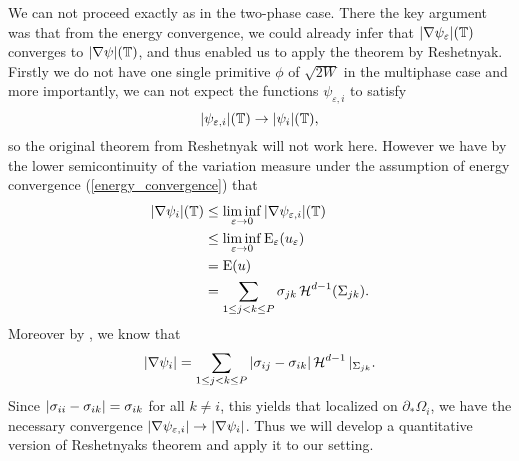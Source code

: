 \begin{remark}
	\label{difference_twophase_multiphase_curvature}
	We can not proceed exactly as in the two-phase case. There the key argument 
	was that from the energy convergence, we could already infer that 
	$ \abs{ \nabla \psi_{ \varepsilon } } ( \operatorname{\mathbb{T}} ) $ converges to $ \abs{ 
	\nabla \psi } ( \operatorname{\mathbb{T}} ) $, and thus enabled us to apply the theorem by 
	Reshetnyak. Firstly we do not have one single
	primitive $ \phi $ of $ \sqrt{ 2 W } $ in the multiphase case and more 
	importantly, we can 
	not expect the functions $ 
	\psi_{ \varepsilon ,  i } $ to satisfy 
	\begin{equation}
		\label{energy_convergence_of_psi_i}
		\abs{ \psi_{ \varepsilon ,i } } ( \operatorname{\mathbb{T}} ) \to \abs{ \psi_{ i } } ( 
		\operatorname{\mathbb{T}} ),
	\end{equation}
	so the original theorem from Reshetnyak will not work here. However we have 
	by the lower semicontinuity of the variation measure under the assumption 
	of energy convergence (\ref{energy_convergence}) that
	\begin{align*}
		\abs{ \nabla \psi_{ i } } ( \operatorname{\mathbb{T}} )
		&
		\leq
		\liminf_{ \varepsilon \to 0 }
		\abs{ \nabla \psi_{ \varepsilon , i } } ( \operatorname{\mathbb{T}} )
		\\
		& \leq
		\liminf_{ \varepsilon \to 0 }
		\operatorname{E}_{ \varepsilon } ( u_{ \varepsilon } )
		\\
		& =
		\operatorname{E} ( u )
		\\
		& =
		\sum_{ 1 \leq j < k \leq P }
		\sigma_{ j k }
		\operatorname{\mathcal{H}}^{ d -1 } ( \Sigma_{ j k } ).
	\end{align*}
	Moreover by , we know that
	\begin{equation*}
		\abs{ \nabla \psi_{ i } }
		=
		\sum_{ 1 \leq j < k \leq P }
		\abs{ \sigma_{ i j } - \sigma_{ i k } }
		\operatorname{\mathcal{H}}^{ d - 1 } |_{ \Sigma_{ j k } }.
	\end{equation*}
	Since $ \abs{ \sigma_{ i i } - \sigma_{ i k } } = \sigma_{ i k } $ for all 
	$ k \neq i $,
	this yields that localized on $ \partial_{ \ast } \Omega_{ i } $, we have 
	the necessary convergence $ \abs{ \nabla \psi_{ \varepsilon ,i } } \to 
	\abs{ \nabla \psi_{ i } } $. Thus we will develop a quantitative version of 
	Reshetnyaks theorem and apply it to our setting.
\end{remark}

